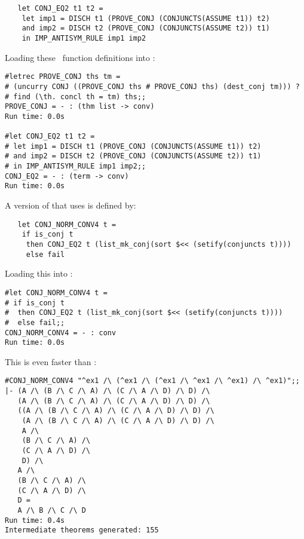 \begin{hol}\begin{verbatim}
   let CONJ_EQ2 t1 t2 =
    let imp1 = DISCH t1 (PROVE_CONJ (CONJUNCTS(ASSUME t1)) t2)
    and imp2 = DISCH t2 (PROVE_CONJ (CONJUNCTS(ASSUME t2)) t1) 
    in IMP_ANTISYM_RULE imp1 imp2
\end{verbatim}\end{hol}

\noindent Loading these \ML\ function definitions into \HOL:

\begin{session}\begin{verbatim}
#letrec PROVE_CONJ ths tm =
# (uncurry CONJ ((PROVE_CONJ ths # PROVE_CONJ ths) (dest_conj tm))) ?
# find (\th. concl th = tm) ths;;
PROVE_CONJ = - : (thm list -> conv)
Run time: 0.0s

#let CONJ_EQ2 t1 t2 =
# let imp1 = DISCH t1 (PROVE_CONJ (CONJUNCTS(ASSUME t1)) t2)
# and imp2 = DISCH t2 (PROVE_CONJ (CONJUNCTS(ASSUME t2)) t1) 
# in IMP_ANTISYM_RULE imp1 imp2;;
CONJ_EQ2 = - : (term -> conv)
Run time: 0.0s
\end{verbatim}\end{session}


\noindent A version of  that
uses  is defined by:

\begin{hol}\begin{verbatim}
   let CONJ_NORM_CONV4 t =
    if is_conj t
     then CONJ_EQ2 t (list_mk_conj(sort $<< (setify(conjuncts t))))
     else fail
\end{verbatim}\end{hol}


\noindent Loading this into \ML:

\begin{session}\begin{verbatim}
#let CONJ_NORM_CONV4 t =
# if is_conj t
#  then CONJ_EQ2 t (list_mk_conj(sort $<< (setify(conjuncts t))))
#  else fail;;
CONJ_NORM_CONV4 = - : conv
Run time: 0.0s
\end{verbatim}\end{session}

\noindent This is even faster than :

\begin{session}\begin{verbatim}
#CONJ_NORM_CONV4 "^ex1 /\ (^ex1 /\ (^ex1 /\ ^ex1 /\ ^ex1) /\ ^ex1)";;
|- (A /\ (B /\ C /\ A) /\ (C /\ A /\ D) /\ D) /\
   (A /\ (B /\ C /\ A) /\ (C /\ A /\ D) /\ D) /\
   ((A /\ (B /\ C /\ A) /\ (C /\ A /\ D) /\ D) /\
    (A /\ (B /\ C /\ A) /\ (C /\ A /\ D) /\ D) /\
    A /\
    (B /\ C /\ A) /\
    (C /\ A /\ D) /\
    D) /\
   A /\
   (B /\ C /\ A) /\
   (C /\ A /\ D) /\
   D =
   A /\ B /\ C /\ D
Run time: 0.4s
Intermediate theorems generated: 155
\end{verbatim}\end{session}

